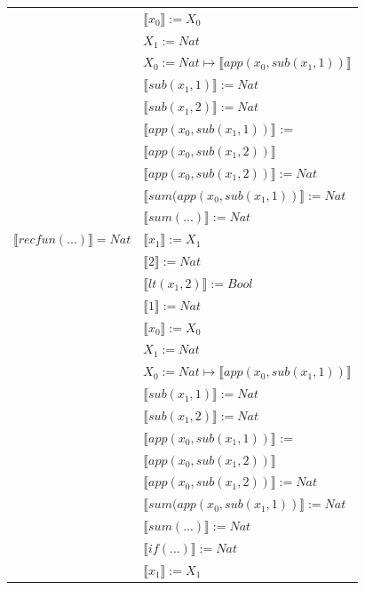 \begin{exercise}
\begin{description}
\begin{center}
\begin{longtable}[!h]{ | l | l | }
			     & $ \llbracket x_0 \rrbracket := X_0$\\
			     & $X_1 := Nat$\\
			     & $X_0 := Nat \mapsto  \llbracket app(x_0, sub(x_1,1)) \rrbracket$\\
			     & $ \llbracket sub(x_1,1) \rrbracket := Nat$\\
			     & $ \llbracket sub(x_1,2) \rrbracket := Nat$ \\
			     & $ \llbracket app(x_0, sub(x_1,1)) \rrbracket$ := \\
			     & $ \llbracket app(x_0, sub(x_1,2)) \rrbracket$\\ 
			     & $ \llbracket app(x_0, sub(x_1,2)) \rrbracket := Nat$ \\
			     & $ \llbracket sum(app(x_0, sub(x_1,1)) \rrbracket := Nat$ \\
			     & $ \llbracket sum(...) \rrbracket := Nat$ \\
                     \hline 
                        $ \llbracket recfun(...) \rrbracket = Nat$ & $ \llbracket x_1 \rrbracket := X_1$\\
                        & $ \llbracket 2 \rrbracket := Nat$\\ 
                        & $ \llbracket lt(x_1 , 2) \rrbracket := Bool$\\  
			     & $ \llbracket 1 \rrbracket := Nat$\\
			     & $ \llbracket x_0 \rrbracket := X_0$\\
			     & $X_1 := Nat$\\
			     & $X_0 := Nat \mapsto  \llbracket app(x_0, sub(x_1,1)) \rrbracket$\\
			     & $ \llbracket sub(x_1,1) \rrbracket := Nat$\\
			     & $ \llbracket sub(x_1,2) \rrbracket := Nat$ \\
			     & $ \llbracket app(x_0, sub(x_1,1)) \rrbracket$ := \\
			     & $ \llbracket app(x_0, sub(x_1,2)) \rrbracket$\\ 
			     & $ \llbracket app(x_0, sub(x_1,2)) \rrbracket := Nat$ \\
			     & $ \llbracket sum(app(x_0, sub(x_1,1)) \rrbracket := Nat$ \\
			     & $ \llbracket sum(...) \rrbracket := Nat$ \\
			     & $ \llbracket if(...) \rrbracket := Nat$  \\
                     \hline 
			     & $ \llbracket x_1 \rrbracket := X_1$\\

\end{longtable}
\end{center}
\end{description}
\end{exercise}
